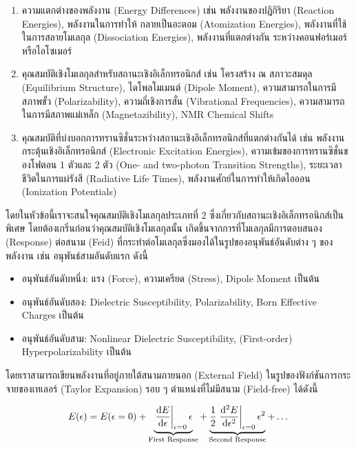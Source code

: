 \begin{enumerate}[topsep=0pt]
    \item ความแตกต่างของพลังงาน (Energy Differences) เช่น พลังงานของปฏิกิริยา (Reaction Energies), พลังงานในการทำให้%
    กลายเป็นอะตอม (Atomization Energies), พลังงานที่ใช้ในการสลายโมเลกุล (Dissociation Energies), พลังงานที่แตกต่างกัน%
    ระหว่างคอนฟอร์เมอร์หรือไอโซเมอร์

    \item คุณสมบัติเชิงโมเลกุลสำหรับสถานะเชิงอิเล็กทรอนิกส์ เช่น โครงสร้าง ณ สภาวะสมดุล (Equilibrium Structure), ไดโพลโมเมนต์ 
    (Dipole Moment), ความสามารถในการมีสภาพขั้ว (Polarizability), ความถี่เชิงการสั่น (Vibrational Frequencies), 
    ความสามารถในการมีสภาพแม่เหล็ก (Magnetazibility), NMR Chemical Shifts

    \item คุณสมบัติที่บ่งบอกการทรานซิชั่นระหว่างสถานะเชิงอิเล็กทรอนิกส์ที่แตกต่างกันได้ เช่น พลังงานกระตุ้นเชิงอิเล็กทรอนิกส์ (Electronic 
    Excitation Energies), ความเข้มของการทรานซิชั่นของโฟตอน 1 ตัวและ 2 ตัว (One- and two-photon Transition Strengths), 
    ระยะเวลาชีวิตในการแผ่รังสี (Radiative Life Times), พลังงานศักย์ในการทำให้เกิดไอออน (Ionization Potentials) 
\end{enumerate}

โดยในหัวข้อนี้เราจะสนใจคุณสมบัติเชิงโมเลกุลประเภทที่ 2 ซึ่งเกี่ยวกับสถานะเชิงอิเล็กทรอนิกส์เป็นพิเศษ โดยต้องเกริ่นก่อนว่าคุณสมบัติเชิงโมเลกุลนั้น%
เกิดขึ้นจากการที่โมเลกุลมีการตอบสนอง (Response) ต่อสนาม (Feid) ที่กระทำต่อโมเลกุลซึ่งมองได้ในรูปของอนุพันธ์อันดับต่าง ๆ ของพลังงาน 
เช่น อนุพันธ์สามอันดับแรก ดังนี้

\begin{itemize}[topsep=0pt]
    \item อนุพันธ์อันดับหนึ่ง: แรง (Force), ความเครียด (Stress), Dipole Moment เป็นต้น
    \item อนุพันธ์อันดับสอง: Dielectric Susceptibility, Polarizability, Born Effective Charges เป็นต้น
    \item อนุพันธ์อันดับสาม: Nonlinear Dielectric Susceptibility, (First-order) Hyperpolarizability เป็นต้น  
\end{itemize}

โดยเราสามารถเขียนพลังงานที่อยู่ภายใต้สนามภายนอก (External Field) ในรูปของฟังก์ชันการกระจายของเทเลอร์ (Taylor Expansion) 
รอบ ๆ ตำแหน่งที่ไม่มีสนาม (Field-free) ได้ดังนี้

\begin{equation}\label{eq:ener_taylor}
    E(\epsilon) = E(\epsilon = 0) 
    + \underbrace{\evaluated{\dv{E}{\epsilon}}_{\epsilon = 0} \epsilon}_{%
    \text{First Response}}
    + \underbrace{\frac{1}{2} \evaluated{\dv[2]{E}{\epsilon}}_{\epsilon = 0} \epsilon^{2}}_{%
    \text{Second Response}}
    + \dots
\end{equation}

